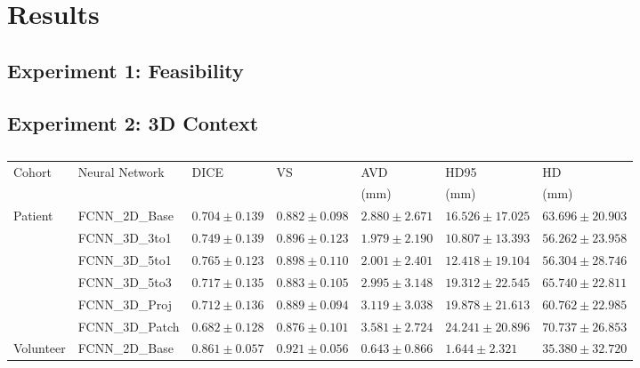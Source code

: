\chapter{Results} \label{app:results}
\section{Experiment 1: Feasibility} %

\section{Experiment 2: 3D Context} %

\begin{sidewaystable}[htbp]
   \centering
   \caption[Segmentation Evaluation Metrics for the different Architectures]{}
   \begin{tabular}{l*{6}{l}}
      \toprule
      Cohort	& Neural Network	& DICE				& VS				& AVD				& HD95				& HD				\\
      			&					&					&					& (mm)				& (mm)				& (mm)				\\
      \midrule
      Patient   & FCNN\_2D\_Base  & $0.704 \pm 0.139$ & $0.882 \pm 0.098$ & $2.880 \pm 2.671$ & $16.526 \pm 17.025$ & $63.696 \pm 20.903$ \\
                & FCNN\_3D\_3to1  & $0.749 \pm 0.139$ & $0.896 \pm 0.123$ & $\mathbf{1.979 \pm 2.190}$ & $\mathbf{10.807 \pm 13.393}$ & $\mathbf{56.262 \pm 23.958}$ \\
                & FCNN\_3D\_5to1  & $\mathbf{0.765 \pm 0.123}$ & $\mathbf{0.898 \pm 0.110}$ & $2.001 \pm 2.401$ & $12.418 \pm 19.104$ & $56.304 \pm 28.746$ \\
                & FCNN\_3D\_5to3  & $0.717 \pm 0.135$ & $0.883 \pm 0.105$ & $2.995 \pm 3.148$ & $19.312 \pm 22.545$ & $65.740 \pm 22.811$ \\
                & FCNN\_3D\_Proj  & $0.712 \pm 0.136$ & $0.889 \pm 0.094$ & $3.119 \pm 3.038$ & $19.878 \pm 21.613$ & $60.762 \pm 22.985$ \\
                & FCNN\_3D\_Patch & $0.682 \pm 0.128$ & $0.876 \pm 0.101$ & $3.581 \pm 2.724$ & $24.241 \pm 20.896$ & $70.737 \pm 26.853$ \\                
      \midrule
      Volunteer & FCNN\_2D\_Base  & $0.861 \pm 0.057$ & $0.921 \pm 0.056$ & $0.643 \pm 0.866$ & $1.644  \pm 2.321 $ & $\mathbf{35.380 \pm 32.720}$ \\

\end{tabular}
\end{sidewaystable}
